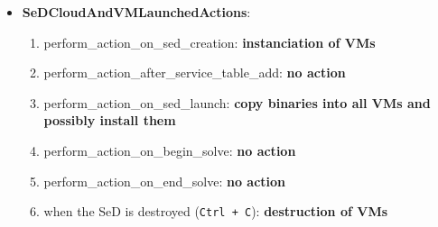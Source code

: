 \begin{itemize}
  \item \textbf{SeDCloudAndVMLaunchedActions}:
    \begin{enumerate}
      \item perform\_action\_on\_sed\_creation: \textbf{instanciation of VMs}
      \item perform\_action\_after\_service\_table\_add: \textbf{no action}
      \item perform\_action\_on\_sed\_launch: \textbf{copy binaries into all VMs and possibly install them}
      \item perform\_action\_on\_begin\_solve: \textbf{no action}
      \item perform\_action\_on\_end\_solve: \textbf{no action}
      \item when the SeD is destroyed (\texttt{Ctrl + C}): \textbf{destruction of VMs}
    \end{enumerate}
 

\end{itemize}
